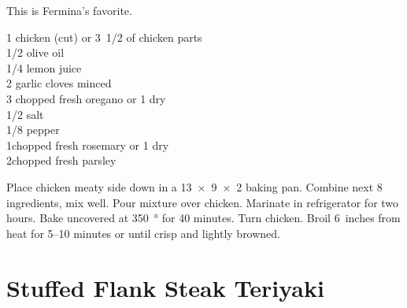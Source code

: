 \begin{open}
  This is Fermina's favorite.
\end{open}
\begin{ingredients}
  1 chicken (cut) or \SI{1/2}[3]{\pound} of chicken parts      \\
  \SI{1/2}{\cup} olive oil                                     \\
  \SI{1/4}{\cup} lemon juice                                   \\
  2 garlic cloves minced                                       \\
  \SI{3}{\tblspoon} chopped fresh oregano or \SI{1}{\tblspoon} dry \\
  \SI{1/2}{\teaspoon} salt                                     \\
  \SI{1/8}{\teaspoon} pepper                                   \\
  \SI{1}{\tblspoon}chopped fresh rosemary or \SI{1}{\teaspoon} dry \\
  \SI{2}{\tblspoon}chopped fresh parsley
\end{ingredients}
Place chicken meaty side down in a \SI{13x9x2}{\inch} baking pan.  Combine
next 8 ingredients, mix well.  Pour mixture over chicken.  Marinate in
refrigerator for two hours.  Bake uncovered at \SI{350}{\degree} for 40 minutes.
Turn chicken.  Broil 6~inches from heat for \numrange{5}{10} minutes or
until crisp and lightly browned.

\section{Stuffed Flank Steak Teriyaki}

